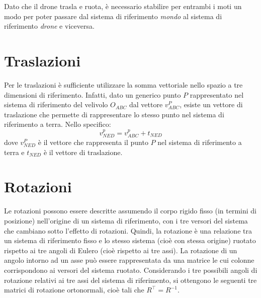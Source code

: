 Dato che il drone trasla e ruota, è necessario stabilire per entrambi i moti un modo per poter passare dal sistema di riferimento \emph{mondo} al sistema di riferimento \emph{drone} e viceversa. 

\section*{Traslazioni}
Per le traslazioni è sufficiente utilizzare la somma vettoriale nello spazio a tre dimensioni di riferimento. Infatti, dato un generico punto $P$ rappresentato nel sistema di riferimento del velivolo $O_{ABC}$ dal vettore $v^P_{ABC}$, esiste un vettore di traslazione che permette di rappresentare lo stesso punto nel sistema di riferimento a terra. Nello specifico:
\[ v^p_{NED} = v^p_{ABC} + t_{NED} \]
dove $v^P_{NED}$ è il vettore che rappresenta il punto $P$ nel sistema di riferimento a terra e $t_{NED}$ è il vettore di traslazione. 

\section*{Rotazioni}
Le rotazioni possono essere descritte assumendo il corpo rigido fisso (in termini di posizione) nell'origine di un sistema di riferimento, con i tre versori del sistema che cambiano sotto l'effetto di rotazioni. Quindi, la rotazione è una relazione tra un sistema di riferimento fisso e lo stesso sistema (cioè con stessa origine) ruotato rispetto ai tre angoli di Eulero (cioè rispetto ai tre assi). La rotazione di un angolo intorno ad un asse può essere rappresentata da una matrice le cui colonne corrispondono ai versori del sistema ruotato. Considerando i tre possibili angoli di rotazione relativi ai tre assi del sistema di riferimento, si ottengono le seguenti tre matrici di rotazione ortonormali, cioè tali che $R^\top = R^{-1}$.

